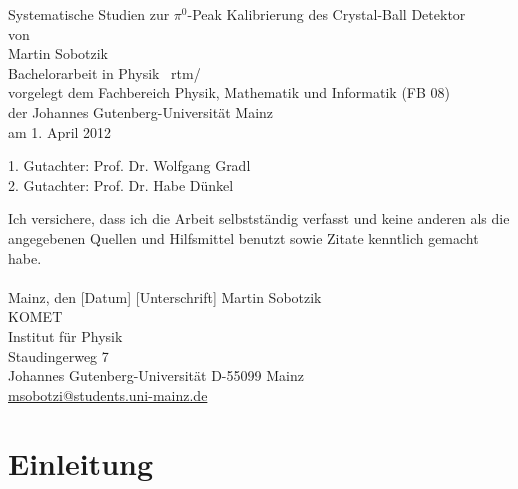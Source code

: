 \documentclass[a4paper,11pt,oneside,final,german,openbib,pdftex]{scrbook}
\begin{document}

\begin{titlepage}
  \vspace*{6mm}
  \begin{center}
     {\afont Systematische Studien zur {$\pi^{0}$}-Peak Kalibrierung des Crystal-Ball Detektor}
     \\[3.5cm]
     {\large von}
     \\[3.5cm]
     {\dfont Martin Sobotzik}
     \\[2cm]
     {\large Bachelorarbeit in Physik \ rtm/\\
        vorgelegt dem Fachbereich Physik, Mathematik und Informatik (FB 08) \/\\
        der Johannes Gutenberg-Universit\"at Mainz \/\\
        am 1. April 2012}
   \end{center}
   \vfill
   1. Gutachter: Prof. Dr. Wolfgang Gradl\\	
   2. Gutachter: Prof. Dr. Habe D\"unkel \\
   \vfill
\end{titlepage}

\thispagestyle{empty}
Ich versichere, dass ich die Arbeit selbstst\"andig verfasst und keine 
anderen als die angegebenen Quellen und Hilfsmittel benutzt sowie 
Zitate kenntlich gemacht habe.
\\
\\[3.5cm] 
Mainz, den [Datum] [Unterschrift]
\vfill
\noindent 
Martin Sobotzik\\
KOMET\\
Institut f\"ur Physik\\
Staudingerweg 7\\
Johannes Gutenberg-Universit\"at
D-55099 Mainz\\
{\url{ msobotzi@students.uni-mainz.de}}

\renewcommand\contentsname{Inhaltsverzeichnis}
\renewcommand\figurename{Abbildung}
\renewcommand\tablename{Tabelle}
\tableofcontents
\clearpage

\mainmatter
\sloppy

\chapter{Einleitung}
\end{document}
